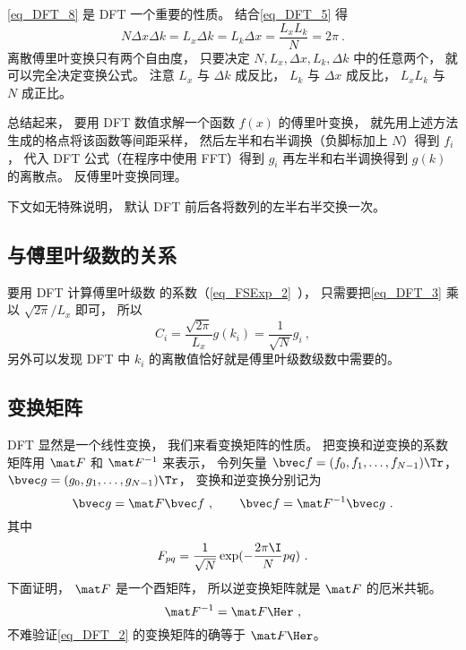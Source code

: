 \autoref{eq_DFT_8} 是 DFT 一个重要的性质。 结合\autoref{eq_DFT_5} 得
\begin{equation}\label{eq_DFT_9}
N\Delta x \Delta k = L_x \Delta k = L_k \Delta x = \frac{L_x L_k}{N} = 2\pi~.
\end{equation}
离散傅里叶变换只有两个自由度， 只要决定 $N, L_x, \Delta x, L_k, \Delta k$ 中的任意两个， 就可以完全决定变换公式。 注意 $L_x$ 与 $\Delta k$ 成反比， $L_k$ 与 $\Delta x$ 成反比， $L_xL_k$ 与 $N$ 成正比。

总结起来， 要用 DFT 数值求解一个函数 $f(x)$ 的傅里叶变换， 就先用上述方法生成的格点将该函数等间距采样， 然后左半和右半调换（负脚标加上 $N$）得到 $f_i$， 代入 DFT 公式（在程序中使用 FFT）得到 $g_i$ 再左半和右半调换得到 $g(k)$ 的离散点。 反傅里叶变换同理。

下文如无特殊说明， 默认 DFT 前后各将数列的左半右半交换一次。

\subsection{与傅里叶级数的关系}
要用 DFT 计算傅里叶级数 的系数（\autoref{eq_FSExp_2}~）， 只需要把\autoref{eq_DFT_3} 乘以 $\sqrt{2\pi}/L_x$ 即可， 所以
\begin{equation}\label{eq_DFT_10}
C_i = \frac{\sqrt{2\pi}}{L_x} g(k_i) = \frac{1}{\sqrt{N}} g_i~,
\end{equation}
另外可以发现 DFT 中 $k_i$ 的离散值恰好就是傅里叶级数级数中需要的。

\subsection{变换矩阵}
DFT 显然是一个线性变换， 我们来看变换矩阵的性质。 把变换和逆变换的系数矩阵用
 $\mat F$ 和 $\mat F^{-1}$ 来表示， 令列矢量 $\bvec f = (f_0,f_1,\dots,f_{N-1})\Tr$， $\bvec g = (g_0,g_1,\dots,g_{N-1})\Tr$， 变换和逆变换分别记为
\begin{equation}
\bvec g = \mat F \bvec f ~,\qquad
\bvec f = \mat F^{-1} \bvec g~.
\end{equation}
其中
\begin{equation}
F_{pq} = \frac{1}{\sqrt{N}} \exp(-\frac{2\pi\I}{N} p q)~.
\end{equation}
下面证明， $\mat F$ 是一个酉矩阵， 所以逆变换矩阵就是 $\mat F$ 的厄米共轭。
\begin{equation}
\mat F^{-1} = \mat F\Her~,
\end{equation}
不难验证\autoref{eq_DFT_2} 的变换矩阵的确等于 $\mat F\Her$。

